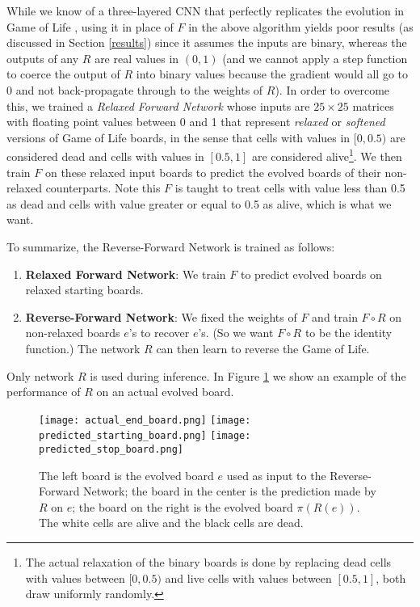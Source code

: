 \documentclass[conference]{IEEEtran}
\begin{document}
While we know of a three-layered CNN that perfectly replicates the evolution in Game of Life \cite{springer2020its}, using it in place of $F$ in the above algorithm yields poor results (as discussed in Section \ref{results}) since it assumes the inputs are binary, whereas the outputs of any $R$ are real values in $(0, 1)$ (and we cannot apply a step function to coerce the output of $R$ into binary values because the gradient would all go to 0 and not back-propagate through to the weights of $R$). In order to overcome this, we trained a \emph{Relaxed Forward Network} whose inputs are $25 \times 25$ matrices with floating point values between 0 and 1 that represent \emph{relaxed} or \emph{softened} versions of Game of Life boards, in the sense that cells with values in $[0, 0.5)$ are considered dead and cells with values in $[0.5, 1]$ are considered alive\footnote{The actual relaxation of the binary boards is done by replacing dead cells with values between $[0, 0.5)$ and live cells with values between $[0.5, 1]$, both draw uniformly randomly.}. We then train $F$ on these relaxed input boards to predict the evolved boards of their non-relaxed counterparts. Note this $F$ is taught to treat cells with value less than 0.5 as dead and cells with value greater or equal to 0.5 as alive, which is what we want.

To summarize, the Reverse-Forward Network is trained as follows:
\begin{enumerate}
    \item \textbf{Relaxed Forward Network}: We train $F$ to predict evolved boards on relaxed starting boards.
    \item \textbf{Reverse-Forward Network}: We fixed the weights of $F$ and train $F \circ R$ on non-relaxed boards $e$'s to recover $e$'s. (So we want $F \circ R$ to be the identity function.) The network $R$ can then learn to reverse the Game of Life.
\end{enumerate}

Only network $R$ is used during inference. In Figure \ref{fig:boards} we show an example of the performance of $R$ on an actual evolved board. 

\begin{figure}[!h]
\begin{center}
  \texttt{[image: actual\_end\_board.png]}
\endminipage\hfill
{}
  \texttt{[image: predicted\_starting\_board.png]}
\endminipage\hfill
{}%
  \texttt{[image: predicted\_stop\_board.png]}
\endminipage
\caption{The left board is the evolved board $e$ used as input to the Reverse-Forward Network; the board in the center is the prediction made by $R$ on $e$; the board on the right is the evolved board $\pi(R(e))$. The white cells are alive and the black cells are dead.}
\label{fig:boards}
\end{center}
\end{figure}
\end{document}
